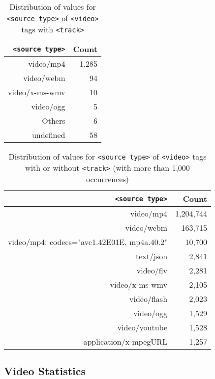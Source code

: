 \documentclass{sig-alternate-ceur}
\begin{document}
\begin{table}[t!]
  \raggedleft
  \footnotesize  
  \begin{tabular}{ r | r }
    \texttt{<source type>} & Count \\
    \hline
    video/mp4 & 1,285\\
    video/webm & 94\\
    video/x-ms-wmv & 10\\    
    video/ogg & 5\\    
    Others & 6\\
    undefined & 58\\  
  \end{tabular}
  \caption{Distribution of values for \texttt{<source type>}
    of \texttt{<video>} tags with \texttt{<track>}}
  \label{table:type}    
\end{table}

\begin{table}[t!]
  \raggedleft
  \footnotesize  
  \begin{tabular}{ r | r }
    \texttt{<source type>} & Count \\
    \hline
    video/mp4 & 1,204,744\\
    video/webm & 163,715\\
    video/mp4; codecs="avc1.42E01E, mp4a.40.2" & 10,700\\
    text/json & 2,841\\
    video/flv & 2,281\\
    video/x-ms-wmv & 2,105\\
    video/flash & 2,023\\
    video/ogg & 1,529\\
    video/youtube & 1,528\\
    application/x-mpegURL & 1,257\\    
  \end{tabular}
  \caption{Distribution of values for \texttt{<source type>}
    of \texttt{<video>} tags with or without  \texttt{<track>}
    \tiny (with more than 1,000 occurrences)}
  \label{table:typeFull}    
\end{table}

\subsection{Video Statistics}
\end{document}
